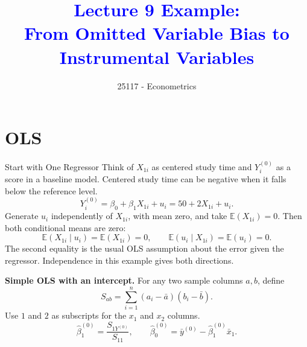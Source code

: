 \documentclass[10pt,aspectratio=169]{beamer}
\title[]{\textcolor{blue}{Lecture 9 Example:\\From Omitted Variable Bias to Instrumental Variables}}
\author{25117 - Econometrics}
\institute[shortinst]{Universitat Pompeu Fabra}
\date{}
\newcommand{\E}{\mathbb E}
\begin{document}
\begin{frame}[plain]
\maketitle
\end{frame}

\section{OLS}

\begin{frame}{Start with One Regressor}
Think of $X_{1i}$ as centered study time and $Y_i^{(0)}$ as a score in a baseline model. Centered study time can be negative when it falls below the reference level.
\[
Y_i^{(0)}=\beta_0+\beta_1 X_{1i}+u_i=50+2X_{1i}+u_i.
\]
Generate $u_i$ independently of $X_{1i}$, with mean zero, and take $\E(X_{1i})=0$. Then both conditional means are zero:
\[
\E(X_{1i}\mid u_i)=\E(X_{1i})=0,
\qquad
\E(u_i\mid X_{1i})=\E(u_i)=0.
\]
The second equality is the usual OLS assumption about the error given the regressor. Independence in this example gives both directions.
\medskip

\textbf{Simple OLS with an intercept.} For any two sample columns $a,b$, define
\[
S_{ab}=\sum_{i=1}^n(a_i-\bar a)(b_i-\bar b).
\]
Use $1$ and $2$ as subscripts for the $x_1$ and $x_2$ columns.
\[
\hat\beta_1^{(0)}=\frac{S_{1Y^{(0)}}}{S_{11}},
\qquad
\hat\beta_0^{(0)}=\bar y^{(0)}-\hat\beta_1^{(0)}\bar x_1.
\]
\end{frame}
\end{document}
